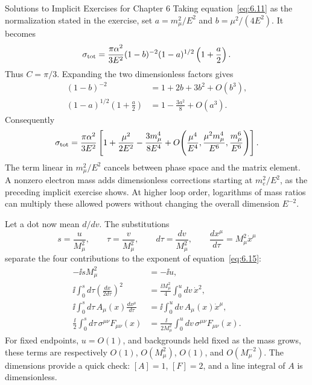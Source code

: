 \begin{bankssolutions}{Solutions to Implicit Exercises for Chapter 6}
Taking equation~\eqref{eq:6.11} as the normalization stated in the exercise,
set \(a=m_\mu^2/E^2\) and \(b=\mu^2/(4E^2)\).  It becomes
\begin{equation*}
 \sigma_{\rm tot}=\frac{\pi\alpha^2}{3E^2}
 (1-b)^{-2}(1-a)^{1/2}\left(1+\frac a2\right).
\end{equation*}
Thus \(C=\pi/3\).  Expanding the two dimensionless factors gives
\begin{align*}
 (1-b)^{-2}&=1+2b+3b^2+O(b^3),\\
 (1-a)^{1/2}\left(1+\frac a2\right)
 &=1-\frac{3a^2}{8}+O(a^3).
\end{align*}
Consequently
\begin{equation*}
 \sigma_{\rm tot}=\frac{\pi\alpha^2}{3E^2}
 \left[1+\frac{\mu^2}{2E^2}
 -\frac{3m_\mu^4}{8E^4}
 +O\!\left(\frac{\mu^4}{E^4},
 \frac{\mu^2m_\mu^4}{E^6},\frac{m_\mu^6}{E^6}\right)\right].
\end{equation*}
The term linear in \(m_\mu^2/E^2\) cancels between phase space and the
matrix element.  A nonzero electron mass adds dimensionless corrections
starting at \(m_e^2/E^2\), as the preceding implicit exercise shows.  At
higher loop order, logarithms of mass ratios can multiply these allowed
powers without changing the overall dimension \(E^{-2}\).

Let a dot now mean \(d/dv\).  The substitutions
\begin{equation*}
 s=\frac{u}{M_\mu^2},\qquad
 \tau=\frac{v}{M_\mu^2},\qquad
 d\tau=\frac{dv}{M_\mu^2},\qquad
 \frac{dx^\mu}{d\tau}=M_\mu^2\dot x^\mu
\end{equation*}
separate the four contributions to the exponent of
equation~\eqref{eq:6.15}:
\begin{align*}
 -\ii sM_\mu^2&=-\ii u,\\
 \ii\int_0^s d\tau\left(\frac{dx}{2d\tau}\right)^2
 &=\frac{\ii M_\mu^2}{4}\int_0^u dv\,\dot x^2,\\
 \ii\int_0^s d\tau\,A_\mu(x)\frac{dx^\mu}{d\tau}
 &=\ii\int_0^u dv\,A_\mu(x)\dot x^\mu,\\
 \frac{\ii}{2}\int_0^s d\tau\,\sigma^{\mu\nu}F_{\mu\nu}(x)
 &=\frac{\ii}{2M_\mu^2}\int_0^u dv\,
   \sigma^{\mu\nu}F_{\mu\nu}(x).
\end{align*}
For fixed endpoints, \(u=O(1)\), and backgrounds held fixed as the mass
grows, these terms are respectively \(O(1)\), \(O(M_\mu^2)\),
\(O(1)\), and \(O(M_\mu^{-2})\).  The dimensions provide a quick check:
\([A]=1\), \([F]=2\), and a line integral of \(A\) is dimensionless.


\end{bankssolutions}
